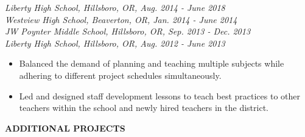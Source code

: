 \documentclass[11pt]{article}
\begin{document}
\textsl{Liberty High School, Hillsboro, OR, Aug. 2014 - June 2018}\\
\textsl{Westview High School, Beaverton, OR, Jan. 2014 - June 2014}\\
\textsl{JW Poynter Middle School, Hillsboro, OR, Sep. 2013 - Dec. 2013}\\
\textsl{Liberty High School, Hillsboro, OR, Aug. 2012 - June 2013}
\begin{itemize}[leftmargin=*, itemsep=0pt, topsep=5pt]
	\item Balanced the demand of planning and teaching multiple subjects while adhering to different project schedules simultaneously.
	\item Led and designed staff development lessons to teach best practices to other teachers within the school and newly hired teachers in the district.
\end{itemize}
\medbreak \noindent
%
%
\noindent
\makebox[0pt][l]{\rule[-.2\baselineskip]{\linewidth}{.3mm}}\large{\textbf{ADDITIONAL PROJECTS}}
\end{document}
